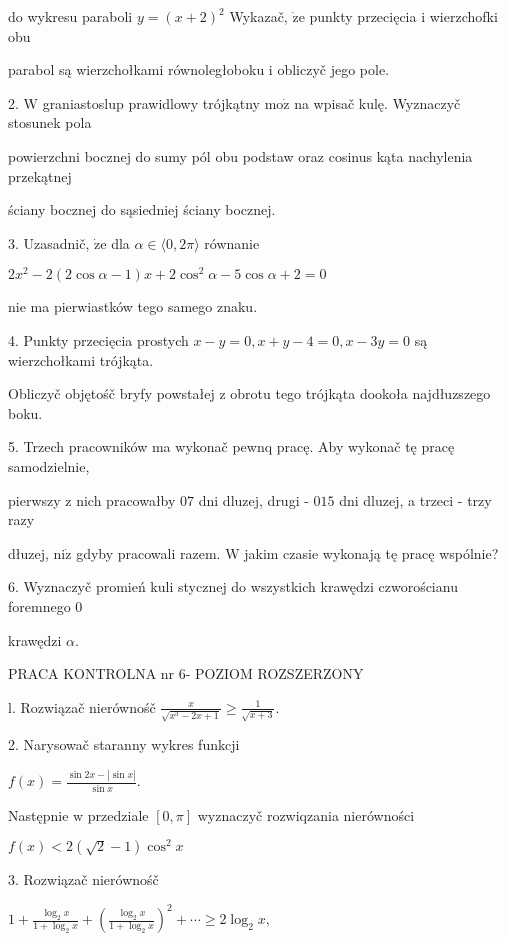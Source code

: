 \documentclass[a4paper,12pt]{article}
\begin{document}
do wykresu paraboli $y = (x+2)^{2}$ Wykazač, $\dot{\mathrm{z}}\mathrm{e}$ punkty przecięcia $\mathrm{i}$ wierzchofki obu

parabol są wierzchołkami równoległoboku $\mathrm{i}$ obliczyč jego pole.

2. $\mathrm{W}$ graniastoslup prawidlowy trójkątny $\mathrm{m}\mathrm{o}\dot{\mathrm{z}}$ na wpisač kulę. Wyznaczyč stosunek pola

powierzchni bocznej do sumy pól obu podstaw oraz cosinus kąta nachylenia przekątnej

ściany bocznej do sąsiedniej ściany bocznej.

3. Uzasadnič, $\dot{\mathrm{z}}\mathrm{e}$ dla $\alpha\in\langle 0,  2\pi\rangle$ równanie

$2x^{2}-2(2\cos\alpha-1)x+2\cos^{2}\alpha-5\cos\alpha+2=0$

nie ma pierwiastków tego samego znaku.

4. Punkty przecięcia prostych $x-y=0, x+y-4=0, x-3y=0$ są wierzchołkami trójkąta.

Obliczyč objętośč bryfy powstałej $\mathrm{z}$ obrotu tego trójkąta dookoła najdłuzszego boku.

5. Trzech pracowników ma wykonač pewnq pracę. Aby wykonač tę pracę samodzielnie,

pierwszy $\mathrm{z}$ nich pracowałby $07$ dni dluzej, drugi - $015$ dni dluzej, a trzeci - trzy razy

dłuzej, $\mathrm{n}\mathrm{i}\dot{\mathrm{z}}$ gdyby pracowali razem. $\mathrm{W}$ jakim czasie wykonają tę pracę wspólnie?

6. Wyznaczyč promień kuli stycznej do wszystkich krawędzi czworościanu foremnego $0$

krawędzi $\alpha.$





PRACA KONTROLNA nr 6- POZIOM ROZSZERZONY

l. Rozwiązač nierównośč $\displaystyle \frac{x}{\sqrt{x^{3}-2x+1}}\geq\frac{1}{\sqrt{x+3}}.$

2. Narysowač staranny wykres funkcji

$f(x)=\displaystyle \frac{\sin 2x-|\sin x|}{\sin x}.$

Następnie $\mathrm{w}$ przedziale $[0,\pi]$ wyznaczyč rozwiqzania nierówności

$f(x)<2(\sqrt{2}-1)\cos^{2}x$

3. Rozwiązač nierównośč

$1+\displaystyle \frac{\log_{2}x}{1+\log_{2}x}+(\frac{\log_{2}x}{1+\log_{2}x})^{2}+\cdots\geq 2\log_{2}x,$
\end{document}
